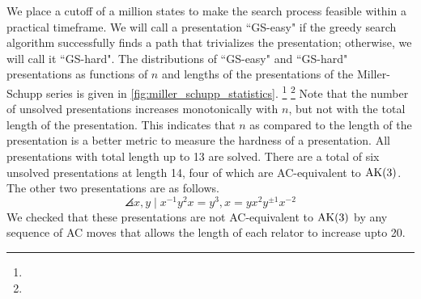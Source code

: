 We place a cutoff of a million states to make the search process feasible within a practical timeframe. We will call a presentation ``GS-easy" if the greedy search algorithm successfully finds a path that trivializes the presentation; otherwise, we will call it ``GS-hard". The distributions of ``GS-easy" and ``GS-hard" presentations as functions of $n$ and lengths of the presentations of the Miller-Schupp series is given in \autoref{fig:miller_schupp_statistics}. 
\footnote{}
\footnote{}
Note that the number of unsolved presentations increases monotonically with $n$, but not with the total length of the presentation. This indicates that $n$ as compared to the length of the presentation is a better metric to measure the hardness of a presentation. 
All presentations with total length up to 13 are solved. 
There are a total of six unsolved presentations at length 14, four of which are AC-equivalent to $\text{AK}(3)$. The other two presentations are as follows. 
\[
\angles{x, y \mid x^{-1} y^2 x = y^{3} , x = y x^2 y^{\pm 1} x^{-2}}
\]
We checked that these presentations are not AC-equivalent to $\text{AK}(3)$ by any sequence of AC moves that allows the length of each relator to increase upto 20.








